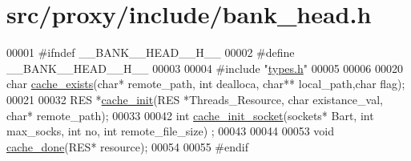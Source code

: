 \hypertarget{bank__head_8h_source}{
\section{src/proxy/include/bank\_\-head.h}
}

\begin{DoxyCode}
00001 \textcolor{preprocessor}{#ifndef \_\_BANK\_\_HEAD\_\_H\_\_}
00002 \textcolor{preprocessor}{}\textcolor{preprocessor}{#define \_\_BANK\_\_HEAD\_\_H\_\_}
00003 \textcolor{preprocessor}{}
00004 \textcolor{preprocessor}{#include "\hyperlink{types_8h}{types.h}"}
00005 
00006 
00020 \textcolor{keywordtype}{char} \hyperlink{bank__head_8h_aa37408ed08dc415b076779d220c2a16b}{cache_exists}(\textcolor{keywordtype}{char}* remote\_path, \textcolor{keywordtype}{int} dealloca, \textcolor{keywordtype}{char}** local\_path,\textcolor{keywordtype}{char} flag);
00021 
00032 RES *\hyperlink{bank__head_8h_a1a6cc69578f155db9f523fe3cb0a9cc2}{cache_init}(RES *Threads\_Resource, \textcolor{keywordtype}{char} existance\_val, \textcolor{keywordtype}{char}* remote\_path);
00033 
00042 \textcolor{keywordtype}{int} \hyperlink{bank__head_8h_a3a2816dfcda244619c7ab8ce1411f2fc}{cache_init_socket}(sockets* Bart, \textcolor{keywordtype}{int} max\_socks, \textcolor{keywordtype}{int} no, \textcolor{keywordtype}{int} remote\_file\_size)
       ;
00043 
00044 
00053 \textcolor{keywordtype}{void} \hyperlink{bank__head_8h_a9b85983f9add0b5f18181f7bb7918ed5}{cache_done}(RES* resource);
00054 
00055 \textcolor{preprocessor}{#endif}
\end{DoxyCode}

